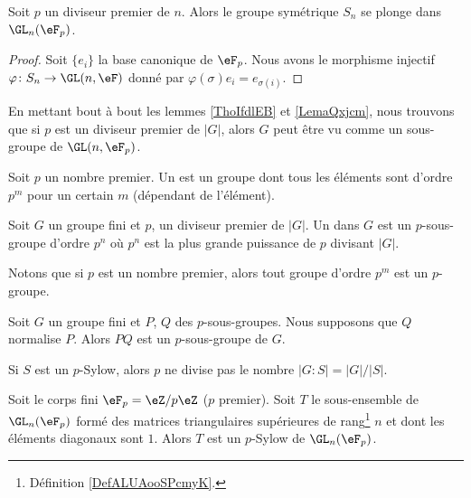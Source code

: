 \begin{lemma}       \label{LemaQxjcm}
    Soit \( p\) un diviseur premier de \( n\). Alors le groupe symétrique \( S_n\) se plonge dans \( \GL_n(\eF_p)\).
\end{lemma}

\begin{proof}
    Soit \( \{ e_i \}\) la base canonique de \( \eF_p\). Nous avons le morphisme injectif $\varphi\colon S_n\to \GL(n,\eF)$ donné par \( \varphi(\sigma)e_i=e_{\sigma(i)}\).
\end{proof}
 
\begin{remark}  \label{RemFzxxst}
    En mettant bout à bout les lemmes \ref{ThoIfdlEB} et \ref{LemaQxjcm}, nous trouvons que si \( p\) est un diviseur premier de \( | G |\), alors \( G\) peut être vu comme un sous-groupe de \( \GL(n,\eF_p)\).
\end{remark}

\begin{definition}      \label{DEFooPRCHooVZdwST}
    Soit \( p\) un nombre premier. Un  est un groupe dont tous les éléments sont d'ordre \( p^m\) pour un certain \( m\) (dépendant de l'élément).

    Soit \( G\) un groupe fini et \( p\), un diviseur premier de $| G |$. Un  dans \( G\) est un \( p\)-sous-groupe d'ordre \( p^n\) où \( p^n\) est la plus grande puissance de \( p\) divisant \( | G |\).
\end{definition}
Notons que si \( p\) est un nombre premier, alors tout groupe d'ordre \( p^m\) est un \( p\)-groupe.

\begin{lemma}
    Soit \( G\) un groupe fini et \( P\), \( Q\) des \( p\)-sous-groupes. Nous supposons que \( Q\) normalise \( P\). Alors \( PQ\) est un \( p\)-sous-groupe de \( G\).
\end{lemma}

Si \( S\) est un \( p\)-Sylow, alors \( p\) ne divise pas le nombre \( | G:S |=| G |/| S |\).

\begin{proposition}     \label{Propvocmon}
    Soit le corps fini \( \eF_p=\eZ/p\eZ\) (\( p\) premier). Soit \( T\) le sous-ensemble de \( \GL_n(\eF_p)\) formé des matrices triangulaires supérieures de rang\footnote{Définition \ref{DefALUAooSPcmyK}.} \( n\) et dont les éléments diagonaux sont \( 1\). Alors \( T\) est un \( p\)-Sylow de \( \GL_n(\eF_p)\).
\end{proposition}

